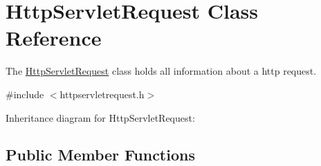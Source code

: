 \hypertarget{class_http_servlet_request}{}\section{Http\+Servlet\+Request Class Reference}
\label{class_http_servlet_request}


The \mbox{\hyperlink{class_http_servlet_request}{Http\+Servlet\+Request}} class holds all information about a http request.  




{\ttfamily \#include $<$httpservletrequest.\+h$>$}



Inheritance diagram for Http\+Servlet\+Request\+:
\subsection*{Public Member Functions}
